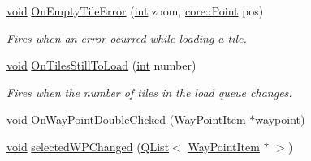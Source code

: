 \begin{DoxyCompactItemize}
\hyperlink{group___u_a_v_objects_plugin_ga444cf2ff3f0ecbe028adce838d373f5c}{void} \hyperlink{group___o_p_map_widget_gad393b8af8f879239faaa466bbc33f4b7}{On\-Empty\-Tile\-Error} (\hyperlink{ioapi_8h_a787fa3cf048117ba7123753c1e74fcd6}{int} zoom, \hyperlink{structcore_1_1_point}{core\-::\-Point} pos)
\begin{DoxyCompactList}\small\item\em Fires when an error ocurred while loading a tile. \end{DoxyCompactList}\item 
\hyperlink{group___u_a_v_objects_plugin_ga444cf2ff3f0ecbe028adce838d373f5c}{void} \hyperlink{group___o_p_map_widget_gad7537ed2e10658cabe5f1f320f31b83f}{On\-Tiles\-Still\-To\-Load} (\hyperlink{ioapi_8h_a787fa3cf048117ba7123753c1e74fcd6}{int} number)
\begin{DoxyCompactList}\small\item\em Fires when the number of tiles in the load queue changes. \end{DoxyCompactList}\item 
\hyperlink{group___u_a_v_objects_plugin_ga444cf2ff3f0ecbe028adce838d373f5c}{void} \hyperlink{group___o_p_map_widget_ga76257e275a9d3c05a75b0fca87faba3d}{On\-Way\-Point\-Double\-Clicked} (\hyperlink{classmapcontrol_1_1_way_point_item}{Way\-Point\-Item} $\ast$waypoint)
\item 
\hyperlink{group___u_a_v_objects_plugin_ga444cf2ff3f0ecbe028adce838d373f5c}{void} \hyperlink{group___o_p_map_widget_ga173f22c1dd41ac235400d05eb42eeff6}{selected\-W\-P\-Changed} (\hyperlink{class_q_list}{Q\-List}$<$ \hyperlink{classmapcontrol_1_1_way_point_item}{Way\-Point\-Item} $\ast$ $>$)
\end{DoxyCompactItemize}
